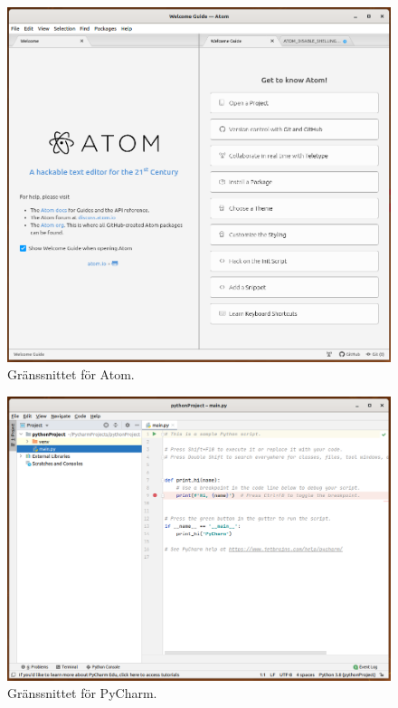 \begin{frame}
  \begin{figure}
    \centering
    \includegraphics[height=0.8\textheight]{figs/atom.png}
    \caption{Gränssnittet för Atom.}
  \end{figure}
\end{frame}

\begin{frame}
  \begin{figure}
    \centering
    \includegraphics[height=0.8\textheight]{figs/pycharm.png}
    \caption{Gränssnittet för PyCharm.}
  \end{figure}
\end{frame}


